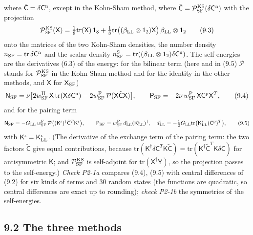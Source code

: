 \documentclass[
  10pt,
]{article}
\begin{document}
where \(\tilde{\mathsf C}=\delta\mathsf C^{\rm n}\), except in the
Kohn-Sham method, where
\(\tilde{\mathsf C}=\mathcal P^{\rm KS}_{\rm SF}(\delta\mathsf C^{\rm n})\)
with the projection
\[\mathcal P^{\rm KS}_{\rm SF}(\mathsf X)=\tfrac18\mathrm{tr}(\mathsf X)\,\mathsf 1_8+\tfrac18\mathrm{tr}\big((\beta_{\rm LL}\otimes\mathsf 1_2)\mathsf X\big)\,\beta_{\rm LL}\otimes\mathsf 1_2\tag{9.3}\]
onto the matrices of the two Kohn-Sham densities, the number density
\(n_{\rm SF}=\mathrm{tr}\,\delta\mathsf C^{\rm n}\) and the scalar
density
\(n^{\rm S}_{\rm SF}=\mathrm{tr}((\beta_{\rm LL}\otimes\mathsf 1_2)\delta\mathsf C^{\rm n})\).
The self-energies are the derivatives (6.3) of the energy: for the
bilinear term (here and in (9.5) \(\mathcal P\) stands for
\(\mathcal P^{\rm KS}_{\rm SF}\) in the Kohn-Sham method and for the
identity in the other methods, and \(\mathsf X\) for
\(\mathsf X_{\rm SF}\))
\[\mathsf N_{\rm SF}=\nu\big[2w^{\rm H}_{\rm SF}\,\mathsf X\,\mathrm{tr}(\mathsf X\delta\mathsf C^{\rm n})-2w^{\rm F}_{\rm SF}\,\mathcal P(\mathsf X\tilde{\mathsf C}\mathsf X)\big],\qquad\mathsf P_{\rm SF}=-2\nu\,w^{\rm P}_{\rm SF}\,\mathsf X\mathsf C^{\rm p}\mathsf X^T,\tag{9.4}\]
and for the pairing term
\[\mathsf N_{\rm SF}=-G_{\rm LL}\,w^{\rm F}_{\rm SF}\,\mathcal P\big((\mathsf K^\iota)^\dagger\tilde{\mathsf C}^T\mathsf K^\iota\big),\qquad\mathsf P_{\rm SF}=w^{\rm P}_{\rm SF}\,d^\iota_{\rm LL}(\mathsf K^\iota_{\rm LL})^\dagger,\quad d^\iota_{\rm LL}=-\tfrac12G_{\rm LL}\mathrm{tr}\big(\mathsf K^\iota_{\rm LL}(\mathsf C^{\rm p})^T\big),\tag{9.5}\]
with \(\mathsf K^\iota=\mathsf K^\iota_{\rm LL}\). (The derivative of
the exchange term of the pairing term: the two factors
\(\tilde{\mathsf C}\) give equal contributions, because
\(\mathrm{tr}(\mathsf K^\dagger\delta\mathsf C^T\mathsf K\tilde{\mathsf C})=\mathrm{tr}(\mathsf K^\dagger\tilde{\mathsf C}^T\mathsf K\delta\mathsf C)\)
for antisymmetric \(\mathsf K\); and \(\mathcal P^{\rm KS}_{\rm SF}\) is
self-adjoint for \(\mathrm{tr}(\mathsf X^\dagger\mathsf Y)\), so the
projection passes to the self-energy.) \emph{Check P2-1a} compares
(9.4), (9.5) with central differences of (9.2) for six kinds of terms
and 30 random states (the functions are quadratic, so central
differences are exact up to rounding); \emph{check P2-1b} the symmetries
of the self-energies.

\hypertarget{the-three-methods}{%
\subsection{9.2 The three methods}\label{the-three-methods}}
\end{document}
